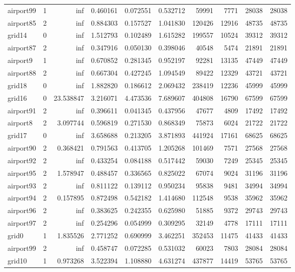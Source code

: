 \begin{longtable}{|l|r|r|r|r|r|r|r|r|r|}
airport99 & 1 & inf & 0.460161 & 0.072551 & 0.532712 & 59991 & 7771 & 28038 & 28038 \\
airport85 & 2 & inf & 0.884303 & 0.157527 & 1.041830 & 120426 & 12916 & 48735 & 48735 \\
grid14 & 0 & inf & 1.512793 & 0.102489 & 1.615282 & 199557 & 10524 & 39312 & 39312 \\
airport87 & 2 & inf & 0.347916 & 0.050130 & 0.398046 & 40548 & 5474 & 21891 & 21891 \\
airport9 & 1 & inf & 0.670852 & 0.281345 & 0.952197 & 92281 & 13135 & 47449 & 47449 \\
airport88 & 2 & inf & 0.667304 & 0.427245 & 1.094549 & 89422 & 12329 & 43721 & 43721 \\
grid18 & 0 & inf & 1.882820 & 0.186612 & 2.069432 & 238419 & 12236 & 45999 & 45999 \\
grid16 & 0 & 23.538847 & 3.216071 & 4.473536 & 7.689607 & 404808 & 16790 & 67599 & 67599 \\
airport91 & 2 & inf & 0.396611 & 0.041345 & 0.437956 & 47677 & 4809 & 17492 & 17492 \\
airport8 & 2 & 3.097744 & 0.596819 & 0.271530 & 0.868349 & 75873 & 6024 & 21722 & 21722 \\
grid17 & 0 & inf & 3.658688 & 0.213205 & 3.871893 & 441924 & 17161 & 68625 & 68625 \\
airport90 & 2 & 0.368421 & 0.791563 & 0.413705 & 1.205268 & 101469 & 7571 & 27568 & 27568 \\
airport92 & 2 & inf & 0.433254 & 0.084188 & 0.517442 & 59030 & 7249 & 25345 & 25345 \\
airport95 & 2 & 1.578947 & 0.488457 & 0.336565 & 0.825022 & 67074 & 9024 & 31196 & 31196 \\
airport93 & 2 & inf & 0.811122 & 0.139112 & 0.950234 & 95838 & 9481 & 34994 & 34994 \\
airport94 & 2 & 0.157895 & 0.872498 & 0.542182 & 1.414680 & 112548 & 9538 & 35962 & 35962 \\
airport96 & 2 & inf & 0.383625 & 0.242355 & 0.625980 & 51885 & 9372 & 29743 & 29743 \\
airport97 & 2 & inf & 0.254296 & 0.054999 & 0.309295 & 32149 & 4778 & 17111 & 17111 \\
grid0 & 1 & 1.835526 & 2.771252 & 0.690999 & 3.462251 & 352453 & 11475 & 41433 & 41433 \\
airport99 & 2 & inf & 0.458747 & 0.072285 & 0.531032 & 60023 & 7803 & 28084 & 28084 \\
grid10 & 1 & 0.973268 & 3.522394 & 1.108880 & 4.631274 & 437877 & 14419 & 53765 & 53765 \\

\end{longtable}
